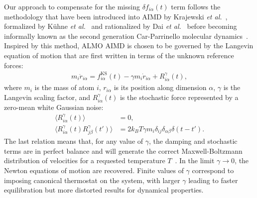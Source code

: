 \documentclass[aps,prl,reprint,amsmath,amssymb]{revtex4-1}
\begin{document}
Our approach to compensate for the missing $\delta f_{i\alpha}(t)$ term follows the methodology that have been introduced into AIMD by Krajewski \emph{et al.}~\cite{RZK:PRB-73-041105R}, formalized by K\"uhne \emph{et al.}~\cite{a:2ndcpmd} and rationalized by Dai \emph{et al.}~\cite{a:langevin-why} before becoming informally known as the second generation Car-Parrinello molecular dynamics~\cite{RZK:10.1002/wcms.1176}. 
Inspired by this method, ALMO AIMD is chosen to be governed by the Langevin equation of motion that are first written in terms of the unknown reference forces:
%
\begin{align}
\label{eq:langevin}
m_i \ddot{r}_{i\alpha} = f^{\text{KS}}_{i\alpha}(t) - \gamma m_i \dot{r}_{i\alpha} + R^{\gamma}_{i\alpha} (t),
\end{align}
%
where $m_i$ is the mass of atom $i$, $r_{i\alpha}$ is its position along dimension $\alpha$, $\gamma$ is the Langevin scaling factor, and $R^{\gamma}_{i\alpha} (t)$ is the stochastic force represented by a zero-mean white Gaussian noise: %
%
\begin{align}
\label{eq:stochastic}
\langle R^{\gamma}_{i\alpha} (t) \rangle &= 0, \\
\langle R^{\gamma}_{i\alpha} (t)  R^{\gamma}_{j\beta} (t') \rangle &= 2 k_B T \gamma m_i \delta_{ij} \delta_{\alpha\beta} \delta(t-t').
\end{align}
% 
The last relation means that, for any value of $\gamma$, the damping and stochastic terms are in perfect balance and will generate the correct Maxwell-Boltzmann distribution of velocities for a requested temperature $T$~\cite{a:Kubo-1986}. 
In the limit $\gamma \rightarrow 0$, the Newton equations of motion are recovered. %
Finite values of $\gamma$ correspond to imposing canonical thermostat on the system, with larger $\gamma$ leading to faster equilibration but more distorted results for dynamical properties. 


\end{document}
